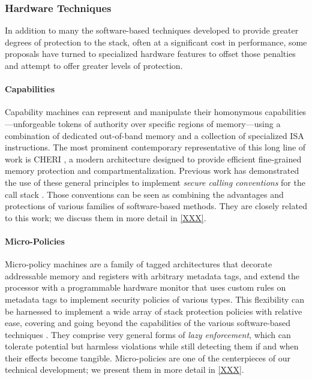 \subsubsection{Hardware Techniques}

In addition to many the software-based techniques developed to provide greater
degrees of protection to the stack, often at a significant cost in performance,
some proposals have turned to specialized hardware features to offset those
penalties and attempt to offer greater levels of protection.
%

\paragraph{Capabilities}
%
%
Capability machines can represent and manipulate their homonymous
capabilities---unforgeable tokens of authority over specific regions of
memory---using a combination of dedicated out-of-band memory and a collection of
specialized ISA instructions.
%
The most prominent contemporary representative of this long line of work is
CHERI \cite{}, a modern architecture designed to provide efficient fine-grained
memory protection and compartmentalization.
%
Previous work has demonstrated the use of these general principles  to implement \emph{secure calling conventions} for the call
stack \cite{}. Those conventions can be seen as combining the advantages and
protections of various families of software-based methods.
%
They are closely related  to this work; we discuss them in more
detail in \cref{XXX}.
%

\paragraph{Micro-Policies}
%
%
Micro-policy machines are a family of tagged architectures that decorate
addressable memory and registers with arbitrary metadata tags, and extend the
processor with a programmable hardware monitor that uses custom rules on
metadata tags to implement security policies of various types.
%
This flexibility can be harnessed to implement a wide array of stack protection policies with relative ease, covering and going beyond the capabilities  of the various software-based techniques \cite{} .
%
They comprise very general forms of \emph{lazy enforcement}, which can tolerate
potential but harmless violations  while still detecting them if and when their effects
become tangible.
%
Micro-policies are one of the centerpieces of our technical development; we
present them in more detail in \cref{XXX}.

